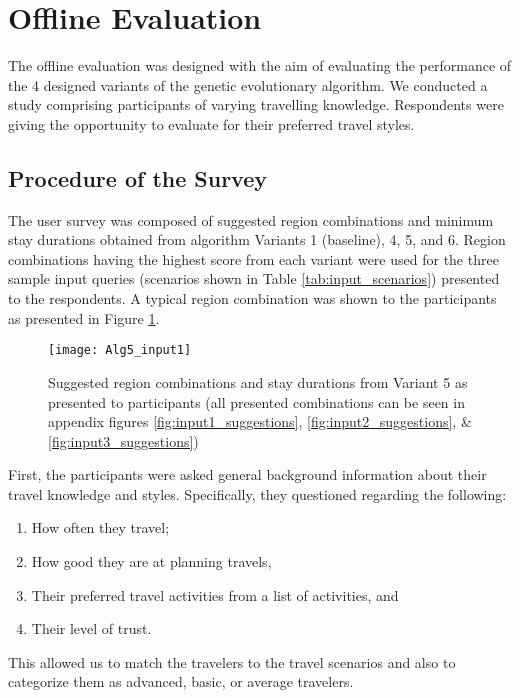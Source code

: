 \section{Offline Evaluation}
The offline evaluation was designed with the aim of evaluating the performance of the 4 designed variants of the genetic evolutionary algorithm. We conducted a study comprising participants of varying travelling knowledge. Respondents were giving the opportunity to evaluate for their preferred travel styles.
\subsection{Procedure of the Survey}
The user survey was composed of suggested region combinations and minimum stay durations obtained from algorithm Variants 1 (baseline), 4, 5, and 6. Region combinations having the highest score from each variant were used for the three sample input queries (scenarios shown in Table \ref{tab:input_scenarios}) presented to the respondents. A typical region combination was shown to the participants as presented in Figure \ref{fig:suggestion}. 

\begin{figure}[h]
    \centering
    \texttt{[image: Alg5\_input1]}
    \caption[Suggested region combinations and stay durations from Variant 5 as presented to participants]{Suggested region combinations and stay durations from Variant 5 as presented to participants (all presented combinations can be seen in appendix figures \ref{fig:input1_suggestions}, \ref{fig:input2_suggestions}, \& \ref{fig:input3_suggestions})}
    \label{fig:suggestion}
\end{figure}

First, the participants were asked general background information about their travel knowledge and styles. Specifically, they questioned regarding the following:
\begin{enumerate}
    \item How often they travel;
    \item How good they are at planning travels,
    \item Their preferred travel activities from a list of activities, and
    \item Their level of trust. 
\end{enumerate}
This allowed us to match the travelers to the travel scenarios and also to categorize them as advanced, basic, or average travelers.

